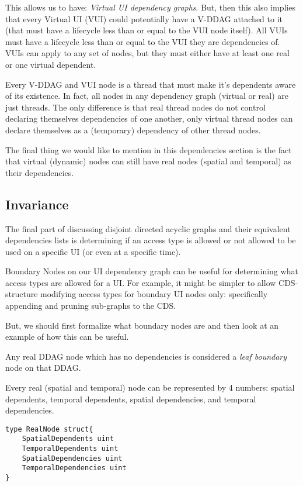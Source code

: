 This allows us to have: \textit{Virtual UI dependency graphs}. But, then this also implies that every Virtual UI (VUI) could potentially have a V-DDAG attached to it (that must have a lifecycle less than or equal to the VUI node itself). All VUIs must have a lifecycle less than or equal to the VUI they are dependencies of. VUIs can apply to any set of nodes, but they must either have at least one real or one virtual dependent.

Every V-DDAG and VUI node is a thread that must make it's dependents aware of its existence. In fact, all nodes in any dependency graph (virtual or real) are just threads. The only difference is that real thread nodes do not control declaring themselves dependencies of one another, only virtual thread nodes can declare themselves as a (temporary) dependency of other thread nodes.

The final thing we would like to mention in this dependencies section is the fact that virtual (dynamic) nodes can still have real nodes (spatial and temporal) as their dependencies.

\subsection{Invariance}

The final part of discussing disjoint directed acyclic graphs and their equivalent dependencies lists is determining if an access type is allowed or not allowed to be used on a specific UI (or even at a specific time).

Boundary Nodes on our UI dependency graph can be useful for determining what access types are allowed for a UI. For example, it might be simpler to allow CDS-structure modifying access types for boundary UI nodes only: specifically appending and pruning sub-graphs to the CDS. 

But, we should first formalize what boundary nodes are and then look at an example of how this can be useful.

\begin{con-def}
	\label{leaf-boundaries}
	Any real DDAG node which has no dependencies is considered a \textit{leaf boundary} node on that DDAG.
\end{con-def}

Every real (spatial and temporal) node can be represented by 4 numbers: spatial dependents, temporal dependents, spatial dependencies, and temporal dependencies.

\begin{verbatim}
type RealNode struct{
	SpatialDependents uint
	TemporalDependents uint
	SpatialDependencies uint
	TemporalDependencies uint
}
\end{verbatim}

